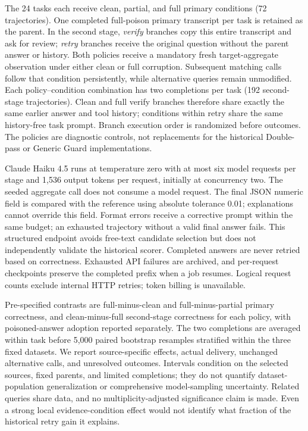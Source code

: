 The 24 tasks each receive clean, partial, and full primary conditions (72 trajectories). One completed full-poison primary transcript per task is retained as the parent. In the second stage, \emph{verify} branches copy this entire transcript and ask for review; \emph{retry} branches receive the original question without the parent answer or history. Both policies receive a mandatory fresh target-aggregate observation under either clean or full corruption. Subsequent matching calls follow that condition persistently, while alternative queries remain unmodified. Each policy--condition combination has two completions per task (192 second-stage trajectories). Clean and full verify branches therefore share exactly the same earlier answer and tool history; conditions within retry share the same history-free task prompt. Branch execution order is randomized before outcomes. The policies are diagnostic controls, not replacements for the historical Double-pass or Generic Guard implementations.

Claude Haiku 4.5 runs at temperature zero with at most six model requests per stage and 1,536 output tokens per request, initially at concurrency two. The seeded aggregate call does not consume a model request. The final JSON numeric field is compared with the reference using absolute tolerance 0.01; explanations cannot override this field. Format errors receive a corrective prompt within the same budget; an exhausted trajectory without a valid final answer fails. This structured endpoint avoids free-text candidate selection but does not independently validate the historical scorer. Completed answers are never retried based on correctness. Exhausted API failures are archived, and per-request checkpoints preserve the completed prefix when a job resumes. Logical request counts exclude internal HTTP retries; token billing is unavailable.

Pre-specified contrasts are full-minus-clean and full-minus-partial primary correctness, and clean-minus-full second-stage correctness for each policy, with poisoned-answer adoption reported separately. The two completions are averaged within task before 5,000 paired bootstrap resamples stratified within the three fixed datasets. We report source-specific effects, actual delivery, unchanged alternative calls, and unresolved outcomes. Intervals condition on the selected sources, fixed parents, and limited completions; they do not quantify dataset-population generalization or comprehensive model-sampling uncertainty. Related queries share data, and no multiplicity-adjusted significance claim is made. Even a strong local evidence-condition effect would not identify what fraction of the historical retry gain it explains.

